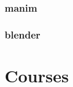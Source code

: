 \documentclass[koma,a4paper,captions=tableheading,11pt,listings-sv,microtype,paralist,colorlinks=true,urlcolor=blue,palatino]{org-article}
\begin{document}
\subsubsection{manim}
\label{sec:org12e9ea1}



\subsubsection{blender}
\label{sec:orgb3042c1}

\section{Courses}
\label{sec:org92abef5}
\end{document}
